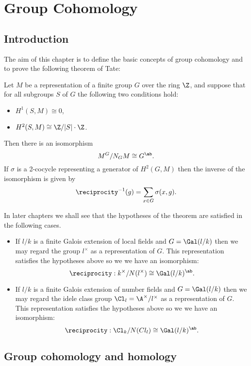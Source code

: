 \chapter{Group Cohomology}

\section{Introduction}

The aim of this chapter is to define the basic concepts of group cohomology and to
prove the following theorem of Tate:

\begin{theorem}
	Let $M$ be a representation of a finite group $G$ over the ring $\Z$, and suppose
	that for all subgroups $S$ of $G$ the following two conditions hold:
	\begin{itemize}
		\item
		$H^1(S,M) \cong 0$,
		\item
		$H^2(S,M) \cong \Z / |S| \cdot \Z$.
	\end{itemize}
	Then there is an isomorphism
	\[
		 M^G / N_G M \cong G^{\ab}.
	\]
	If $\sigma$ is a 2-cocycle representing a generator of $H^2(G,M)$ then the inverse of the
	isomorphism is given by
	\[
		\reciprocity^{-1}(g) = \sum_{x \in G} \sigma(x,g).
	\]
\end{theorem}

In later chapters we shall see that the hypotheses of the theorem are satisfied in the following
cases.
\begin{itemize}
	\item
	If $l/k$ is a finite Galois extension of local fields and $G = \Gal(l/k)$ then we
	may regard the group $l^\times$ as a representation of $G$. This representation
	satisfies the hypotheses above so we we have an isomorphism:
	\[
		\reciprocity :  k^\times / N(l^\times) \cong \Gal(l/k)^{\ab}.
	\]
	\item
	If $l/k$ is a finite Galois extension of number fields and $G = \Gal(l/k)$ then we
	may regard the idele class group $\Cl_l = \A^\times / l^\times$ as a representation of $G$.
	This representation satisfies the hypotheses above so we we have an isomorphism:
	\[
		\reciprocity : \Cl_k / N(Cl_l) \cong \Gal(l/k)^{\ab} .
	\]
\end{itemize}






\section{Group cohomology and homology}

